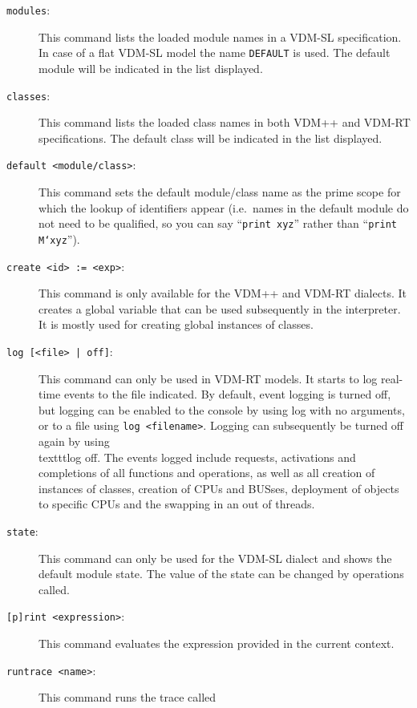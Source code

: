 \documentclass{overturerepchap}
\begin{document}
\begin{description}
\item[\texttt{modules}:] This command lists the loaded module names in
  a VDM-SL specification. In case of a flat VDM-SL model the name
  \texttt{DEFAULT} is used. The default module will be indicated in
  the list displayed.
\item[\texttt{classes}:] This command lists the loaded class names in
  both VDM++ and VDM-RT specifications. The default class will be indicated in
  the list displayed.
\item[\texttt{default <module/class>}:] This command sets the default
  module/class name as the prime scope for which the lookup of
  identifiers appear (i.e.\ names in the default module
do not need to be qualified, so you can say ``\texttt{print xyz}'' rather than
``\texttt{print M`xyz}'').
\item[\texttt{create <id> := <exp>}:] This command is only available
  for the VDM++ and VDM-RT dialects. It creates a global variable that
  can be used subsequently in the interpreter. It is mostly used for
  creating global instances of classes. 
\item[\texttt{log [<file> | off]}:] This command can only be used in
  VDM-RT models. It starts to log real-time events to the file indicated. By
  default, event logging is turned off, but logging can be enabled to
  the console by using log with no arguments, or to a file using \texttt{log
  <filename>}. Logging can subsequently be turned off again by using
  \\texttt{log off}. The events logged include requests, activations and
  completions of all functions and operations, as well as all creation
  of instances of classes, creation of CPUs and BUSses, deployment of objects
  to specific CPUs and the swapping in an out of threads.  
\item[\texttt{state}:] This command can only be used for the VDM-SL
  dialect and shows the default module state.  
  The value of the state can be changed by operations called.
\item[\texttt{[p]rint <expression>}:] This command evaluates the
  expression provided in the current
  context.     
\item[\texttt{runtrace <name>}:] This command runs the trace called

\end{description}
\end{document}
